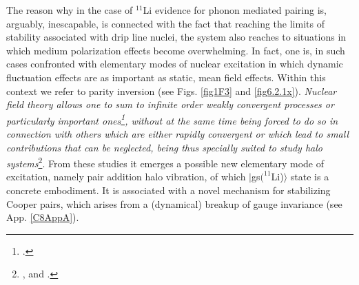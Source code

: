  The reason why in the case of $^{11}$Li evidence for phonon mediated pairing is, arguably, inescapable, is connected with the fact that reaching the limits of stability associated with drip line nuclei, the system also reaches to situations in which medium polarization effects become overwhelming. In fact, one is, in such cases confronted with elementary modes of nuclear excitation in which dynamic fluctuation effects are as important as static, mean field effects. Within this context we refer to  parity inversion (see Figs. \ref{fig1F3}  and \ref{fig6.2.1x}). \textit{Nuclear field theory  allows one to sum to infinite order weakly convergent processes or particularly important ones\footnote{\cite{Bortignon:78}.}, without at the same time being forced to do so in connection with others which are either rapidly convergent or which lead to small contributions that can be neglected, being thus specially suited to study halo systems}\footnote{\citet{Barranco:01,Barranco:17,Barranco:19,Barranco:20}, and \citet{Gori:04}.}. From these studies it emerges a possible new elementary mode of excitation, namely pair addition halo vibration, of which $|$gs$(^{11}$Li)$\rangle$ state is a concrete embodiment. It is associated with a novel mechanism  for stabilizing Cooper pairs, which arises from a (dynamical) breakup of gauge invariance (see App. \ref{C8AppA}). 
 

 
 
